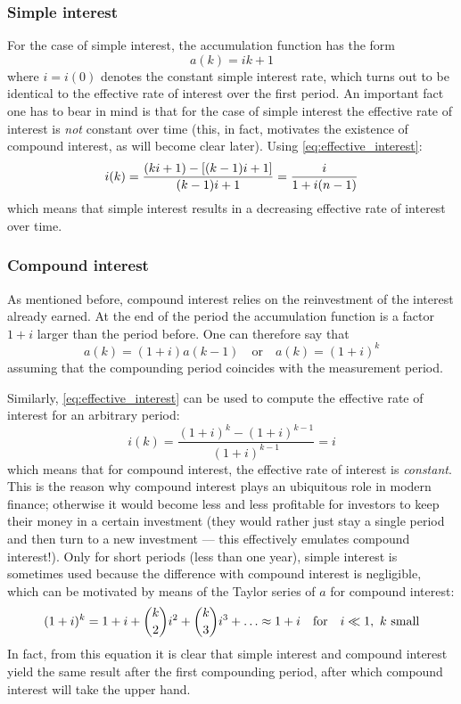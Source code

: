 \subsubsection{Simple interest}
For the case of simple interest, the accumulation function has the form
$$ a(k) = ik + 1 $$ 
where $i = i(0)$ denotes the constant simple interest rate, which turns out to be identical to the effective rate of interest over the first period. An important fact one has to bear in mind is that for the case of simple interest the effective rate of interest is \emph{not} constant over time (this, in fact, motivates the existence of compound interest, as will become clear later). Using \cref{eq:effective_interest}:
$$ i(k) = \frac{\qty(ki + 1) - \qty[(k-1)i + 1]}{(k-1)i + 1} = \frac{i}{1 + i(n-1)}$$
which means that simple interest results in a decreasing effective rate of interest over time. \cite{Kellison1991}

\subsubsection{Compound interest}
As mentioned before, compound interest relies on the reinvestment of the interest already earned. At the end of the period the accumulation function is a factor $1 + i$ larger than the period before. One can therefore say that
$$a(k) = (1 + i)a(k-1)\quad\text{or}\quad a(k) = (1 + i)^{k}$$
assuming that the compounding period coincides with the measurement period. 

Similarly, \cref{eq:effective_interest} can be used to compute the effective rate of interest for an arbitrary period:
$$ i(k) = \frac{(1 + i)^k - (1 + i)^{k-1}}{(1 + i)^{k-1}} = i$$
which means that for compound interest, the effective rate of interest is \emph{constant}. This is the reason why compound interest plays an ubiquitous role in modern finance; otherwise it would become less and less profitable for investors to keep  their money in a certain investment (they would rather just stay a single period and then turn to a new investment --- this effectively emulates compound interest!). Only for short periods (less than one year), simple interest is sometimes used because the difference with compound interest is negligible, which can be motivated by means of the Taylor series of $a$ for compound interest: 
$$ (1 + i)^k = 1 + i +  \binom{k}{2}i^2 + \binom{k}{3}i^3 + \ldots \approx 1 + i\qfor i \ll 1,\ k \text{ small} $$
In fact, from this equation it is clear that simple interest and compound interest yield the same result after the first compounding period, after which compound interest will take the upper hand.

